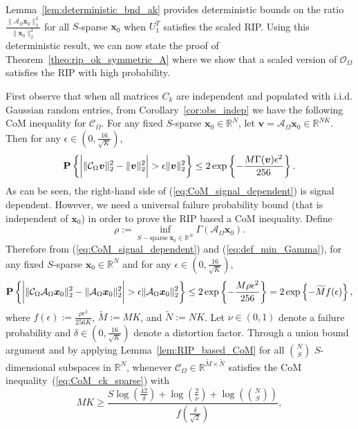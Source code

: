 \documentclass[11pt,draftcls,onecolumn]{IEEEtran}
\def\real    { \mathbb{R} }
\newcommand{\Prob}[1]{{\bf P}\left\{#1\right\}}
\def \ok {{\mathcal{O}_{\Omega}}}
\def \ck {{\mathcal{C}_{\Omega}}}
\def \ak {{\mathcal{A}_{\Omega}}}
\def \km {{\widetilde{M}}}
\def \kn {{\widetilde{N}}}
\newcommand{\vc}[1]{\boldsymbol{#1}}
\def\real    { \mathbb{R} }
\begin{document}
Lemma~\ref{lem:deterministic_bnd_ak} provides deterministic bounds on the ratio $\frac{\|\ak\vc{x}_0\|_2^2}{\|\vc{x}_0\|_2^2}$ for all $S$-sparse $\vc{x}_0$ when $U_1^T$ satisfies the scaled \ac{RIP}. Using this deterministic result, we can now state the proof of Theorem~\ref{theo:rip_ok_symmetric_A} where we show that a scaled version of $\ok$ satisfies the \ac{RIP} with high probability. 


First observe that when all matrices $C_k$ are independent and populated with \ac{i.i.d.} Gaussian random entries, from Corollary~\ref{cor:obs_indep} we have the following \ac{CoM} inequality for 
$\ck$. For any fixed $S$-sparse $\vc{x}_0 \in \real^N$, let $\vc{v} = \ak\vc{x}_0 \in \real^{NK}$. Then for any $\epsilon \in (0,\frac{16}{\sqrt{K}})$,
\begin{equation}
\Prob{\bigg{|}\|\ck \vc{v} \|_{2}^{2}- \|\vc{v}\|_2^2\bigg{|} > \epsilon  \|\vc{v}\|_{2}^{2}}
\leq 2\exp\left\{-\frac{M\Gamma(\vc{v})\epsilon^{2}}{256}\right\}.
\label{eq:CoM_signal_dependent}
\end{equation}
As can be seen, the right-hand side of (\ref{eq:CoM_signal_dependent}) is signal dependent. However, we need a universal failure probability bound (that is independent of $\vc{x}_0$) in order to prove the \ac{RIP} based a \ac{CoM} inequality. Define
\begin{equation}
\rho := \inf_{S-\text{sparse}~\vc{x}_0 \in \real^N} \Gamma(\ak\vc{x}_0).
\label{eq:def_min_Gamma}
\end{equation}
Therefore from (\ref{eq:CoM_signal_dependent}) and (\ref{eq:def_min_Gamma}), for any fixed $S$-sparse $\vc{x}_0 \in \real^N$ and for any $\epsilon \in (0,\frac{16}{\sqrt{K}})$,
\begin{equation}
\Prob{\bigg{|}\|\ck \ak\vc{x}_0 \|_{2}^{2}- \|\ak\vc{x}_0\|_2^2\bigg{|} > \epsilon  \|\ak\vc{x}_0\|_{2}^{2}}
\leq 2\exp\left\{-\frac{M\rho\epsilon^{2}}{256}\right\}
= 2\exp\left\{-\km f(\epsilon)\right\},
\label{eq:CoM_ck_sparse}
\end{equation}
where $f(\epsilon) := \frac{\rho\epsilon^{2}}{256K}$, $\km := MK$, and $\kn := NK$. Let $\nu \in (0,1)$ denote a failure probability and $\delta \in (0,\frac{16}{\sqrt{K}})$ denote a distortion factor.
Through a union bound argument and by applying Lemma~\ref{lem:RIP_based_CoM} for all $N \choose S$ $S$-dimensional subspaces in $\real^N$, whenever $\ck \in \real^{\km \times \kn}$ satisfies the \ac{CoM} inequality~(\ref{eq:CoM_ck_sparse}) with
\begin{equation} 
MK \geq \frac{S\log(\frac{42}{\delta})+\log(\frac{2}{\nu})+\log({N \choose S})}{f(\frac{\delta}{\sqrt{2}})},
\end{equation}
\end{document}
